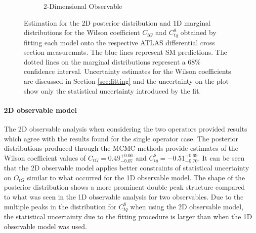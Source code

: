 \documentclass[a4paper,11pt]{article}
\begin{document}
\begin{figure}[H]
\begin{subfigure}[b]{0.45\textwidth}
        \caption{2-Dimensional Observable}
        \label{fig:corner_2D_2OP}
    \end{subfigure}
    \centering
    \caption{Estimation for the 2D posterior distribution and 1D marginal distributions for the Wilson coefficient $C_{tG}$ and $C_{tq}^{8}$ obtained by fitting each model onto the respective ATLAS differential cross section measuremnts. The blue lines represent SM predictions. The dotted lines on the marginal distributions represent a 68\% confidence interval. Uncertainty estimates for the Wilson coefficients are discussed in Section \ref{sec:fitting} and the uncertainty on the plot show only the statistical uncertainty introduced by the fit.}
    \label{fig:corner_2OP}
\end{figure}


\paragraph{2D observable model}

The 2D observable analysis when considering the two operators provided results which agree with the results found for the single operator case.
The posterior distributions produced through the MCMC methods provide estimates of the Wilson coefficient values of $C_{tG}=0.49_{-0.07}^{+0.06}$ and $C_{tq}^{8}=-0.51_{-0.70}^{+0.69}$.
It can be seen that the 2D observable model applies better constraints of statistical uncertainty on $O_{tG}$ similar to what occurred for the 1D observable model.
The shape of the posterior distribution shows a more prominent double peak structure compared to what was seen in the 1D observable analysis for two observables.
Due to the multiple peaks in the distribution for $C_{tq}^{8}$ when using the 2D observable model, the statistical uncertainty due to the fitting procedure is larger than when the 1D observable model was used.

\end{document}
